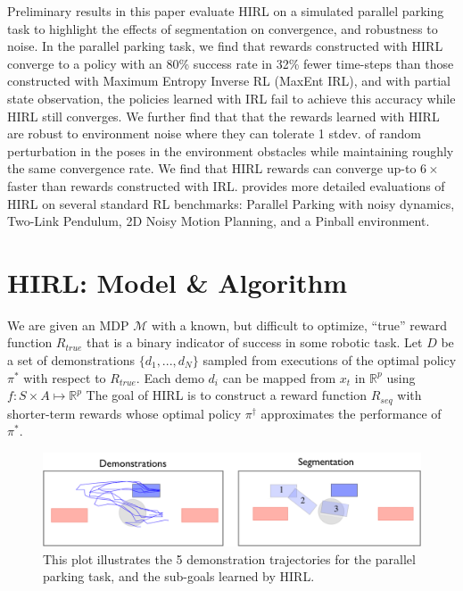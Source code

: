 \documentclass[letterpaper, 10 pt, conference]{ieeeconf}
\newcommand{\hirl}{HIRL\xspace}
\begin{document}
Preliminary results in this paper evaluate HIRL on a simulated parallel parking task to highlight the effects of segmentation on convergence, and robustness to noise. 
In the parallel parking task, we find that rewards constructed with \hirl converge to a policy with an 80\% success rate in 32\% fewer time-steps than those constructed with Maximum Entropy Inverse RL (MaxEnt IRL), and with partial state observation, the policies learned with IRL fail to achieve this accuracy while \hirl still converges.
We further find that that the rewards learned with \hirl are robust to environment noise where they can tolerate 1 stdev. of random perturbation in the poses in the environment obstacles while maintaining roughly the same convergence rate.
We find that \hirl rewards can converge up-to $6\times$ faster than rewards constructed with IRL.
\cite{krishnan2016hirl} provides more detailed evaluations of \hirl on several standard RL benchmarks: Parallel Parking with noisy dynamics, Two-Link Pendulum, 2D Noisy Motion Planning, and a Pinball environment.

\section{HIRL: Model \& Algorithm}
We are given an MDP $\mathcal{M}$ with a known, but difficult to optimize, ``true'' reward function $R_{true}$ that is a binary indicator of success in some robotic task.
Let $D$ be a set of demonstrations $\{d_1,...,d_N\}$ sampled from executions of the optimal policy $\pi^*$ with respect to $R_{true}$. Each demo $d_i$ can be mapped from $x_t$ in $\mathbb{R}^p$ using $f:S\times A \mapsto \mathbb{R}^p$
The goal of \hirl is to construct a reward function $R_{seq}$ with shorter-term rewards whose optimal policy $\pi^\dagger$ approximates the performance of $\pi^*$.

\begin{figure}[t]
\centering
 \includegraphics[width=\columnwidth]{exp/rc-car-segmentation.png}
 \caption{This plot illustrates the 5 demonstration trajectories for the parallel parking task, and the sub-goals learned by \hirl. %
 }
\end{figure}
\end{document}
